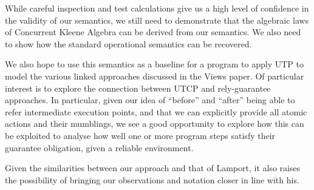 
While careful inspection and test calculations
give us a high level of confidence in the validity of our semantics,
we still need to demonstrate that the algebraic laws
of Concurrent Kleene Algebra\cite{Hoare2009}
can be derived from our semantics.
We also need to show how the standard operational semantics can be recovered.

We also hope to use this semantics as a baseline for a program to apply UTP
to model the various linked approaches discussed in the Views paper\cite{conf/popl/Dinsdale-YoungBGPY13}.
Of particular interest is to explore the connection
between UTCP and rely-guarantee\cite{PhD:CBJones:1981} approaches.
In particular,
given our idea of ``before'' and ``after'' being able to refer intermediate
execution points, and that we can explicitly provide all atomic actions and their mumblings,
we see a good opportunity to explore how this can be exploited
to analyse how well one or more program steps satisfy their
guarantee obligation, given a reliable environment.

Given the similarities between our approach and that of Lamport,
it also raises the possibility of bringing our observations
and notation closer in line with his.
